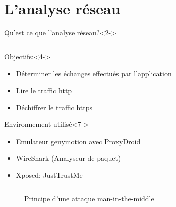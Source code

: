 \documentclass[aspectratio=1610, handout]{beamer}%
\begin{document}
 
\section{L'analyse réseau}
\begin{frame}[t]
  \slidetitle[]
  \begin{block}{Qu'est ce que l'analyse réseau?}<2->
    \end{block}
  \begin{columns}
    \begin{column}{0.7\linewidth}
      \begin{block}{Objectifs:}<4->
        \begin{itemize}
        \item<5-> Déterminer les échanges effectués par l'application
        \item<6-> Lire le traffic http
        \item<7-> Déchiffrer le traffic https
        \end{itemize}
      \end{block}
      \begin{block}{Environnement utilisé}<7->
        \begin{itemize}
          \item<8-> Emulateur genymotion avec ProxyDroid
          \item<9-> WireShark (Analyseur de paquet)
          \item<10-> Xposed: JustTrustMe
          \end{itemize}
      \end{block}    
    \end{column}
    \begin{column}{0.25\linewidth}
      \centering
      
    \end{column}
  \end{columns}
  \vfill
\end{frame}

\begin{frame}[t]
  \slidetitle[Principe]
  \begin{figure}
    \vspace{-0.35cm}
    
    \caption{Principe d'une attaque man-in-the-middle}
  \end{figure}
\end{frame}
\end{document}
